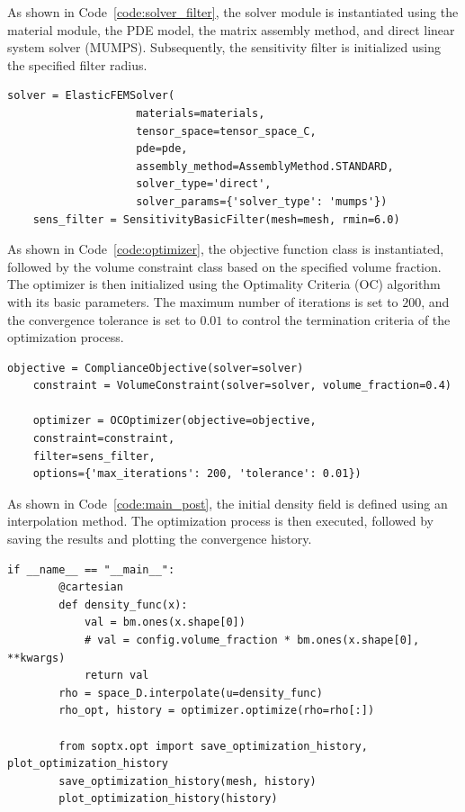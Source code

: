 \documentclass[mathpazo]{cicp}
\begin{document}
As shown in Code~\ref{code:solver_filter}, the solver module is instantiated using the material module, the PDE model, the matrix assembly method, and direct linear system solver (MUMPS). Subsequently, the sensitivity filter is initialized using the specified filter radius.
\begin{lstlisting}[caption={Solver and filter module}, label={code:solver_filter}] 
	solver = ElasticFEMSolver(
					materials=materials,
					tensor_space=tensor_space_C,
					pde=pde,
					assembly_method=AssemblyMethod.STANDARD,
					solver_type='direct',
					solver_params={'solver_type': 'mumps'})
	sens_filter = SensitivityBasicFilter(mesh=mesh, rmin=6.0)
\end{lstlisting}

As shown in Code~\ref{code:optimizer}, the objective function class is instantiated, followed by the volume constraint class based on the specified volume fraction. The optimizer is then initialized using the Optimality Criteria (OC) algorithm with its basic parameters. The maximum number of iterations is set to $200$, and the convergence tolerance is set to $0.01$ to control the termination criteria of the optimization process.

\begin{lstlisting}[caption={Optimization module}, label={code:optimizer}]
	objective = ComplianceObjective(solver=solver)
	constraint = VolumeConstraint(solver=solver, volume_fraction=0.4)
	
	optimizer = OCOptimizer(objective=objective,
	constraint=constraint,
	filter=sens_filter,
	options={'max_iterations': 200, 'tolerance': 0.01})
\end{lstlisting}

As shown in Code~\ref{code:main_post}, the initial density field is defined using an interpolation method. The optimization process is then executed, followed by saving the results and plotting the convergence history.
\begin{lstlisting}[caption={Main program and post-processing}, label={code:main_post}]
	if __name__ == "__main__":
		@cartesian
		def density_func(x):
			val = bm.ones(x.shape[0])
			# val = config.volume_fraction * bm.ones(x.shape[0], **kwargs)
			return val
		rho = space_D.interpolate(u=density_func)
		rho_opt, history = optimizer.optimize(rho=rho[:])
		
		from soptx.opt import save_optimization_history, plot_optimization_history
		save_optimization_history(mesh, history)
		plot_optimization_history(history)
\end{lstlisting}
\end{document}
